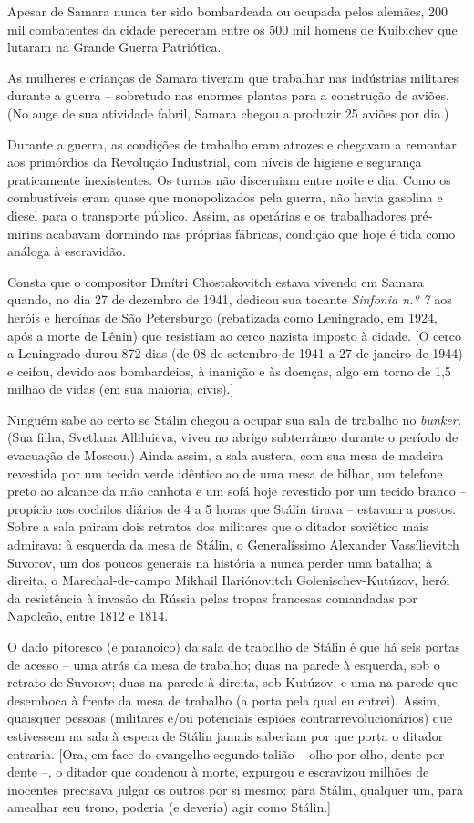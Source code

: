 Apesar de Samara nunca ter sido bombardeada ou ocupada pelos alemães,
200 mil combatentes da cidade pereceram entre os 500 mil homens de
Kuibichev que lutaram na Grande Guerra Patriótica.

As mulheres e crianças de Samara tiveram que trabalhar nas indústrias
militares durante a guerra -- sobretudo nas enormes plantas para a
construção de aviões. (No auge de sua atividade fabril, Samara chegou a
produzir 25 aviões por dia.)

Durante a guerra, as condições de trabalho eram atrozes e chegavam a
remontar aos primórdios da Revolução Industrial, com níveis de higiene e
segurança praticamente inexistentes. Os turnos não discerniam entre
noite e dia. Como os combustíveis eram quase que monopolizados pela
guerra, não havia gasolina e diesel para o transporte público. Assim, as
operárias e os trabalhadores pré-mirins acabavam dormindo nas próprias
fábricas, condição que hoje é tida como análoga à escravidão.

Consta que o compositor Dmítri Chostakovitch estava vivendo em Samara
quando, no dia 27 de dezembro de 1941, dedicou sua tocante
\emph{Sinfonia n.º 7} aos heróis e heroínas de São Petersburgo
(rebatizada como Leningrado, em 1924, após a morte de Lênin) que
resistiam ao cerco nazista imposto à cidade. {[}O cerco a Leningrado
durou 872 dias (de 08 de setembro de 1941 a 27 de janeiro de 1944) e
ceifou, devido aos bombardeios, à inanição e às doenças, algo em torno
de 1,5 milhão de vidas (em sua maioria, civis).{]}

Ninguém sabe ao certo se Stálin chegou a ocupar sua sala de trabalho no
\emph{bunker.} (Sua filha, Svetlana Alliluieva, viveu no abrigo
subterrâneo durante o período de evacuação de Moscou.) Ainda assim, a
sala austera, com sua mesa de madeira revestida por um tecido verde
idêntico ao de uma mesa de bilhar, um telefone preto ao alcance da mão
canhota e um sofá hoje revestido por um tecido branco -- propício aos
cochilos diários de 4 a 5 horas que Stálin tirava -- estavam a postos.
Sobre a sala pairam dois retratos dos militares que o ditador soviético
mais admirava: à esquerda da mesa de Stálin, o Generalíssimo Alexander
Vassílievitch Suvorov, um dos poucos generais na história a nunca perder
uma batalha; à direita, o Marechal-de-campo Mikhail Ilariónovitch
Golenischev-Kutúzov, herói da resistência à invasão da Rússia pelas
tropas francesas comandadas por Napoleão, entre 1812 e 1814.

O dado pitoresco (e paranoico) da sala de trabalho de Stálin é que há
seis portas de acesso -- uma atrás da mesa de trabalho; duas na parede à
esquerda, sob o retrato de Suvorov; duas na parede à direita, sob
Kutúzov; e uma na parede que desemboca à frente da mesa de trabalho (a
porta pela qual eu entrei). Assim, quaisquer pessoas (militares e/ou
potenciais espiões contrarrevolucionários) que estivessem na sala à
espera de Stálin jamais saberiam por que porta o ditador entraria.
{[}Ora, em face do evangelho segundo talião -- olho por olho, dente por
dente --, o ditador que condenou à morte, expurgou e escravizou milhões
de inocentes precisava julgar os outros por si mesmo; para Stálin,
qualquer um, para amealhar seu trono, poderia (e deveria) agir como
Stálin.{]}

